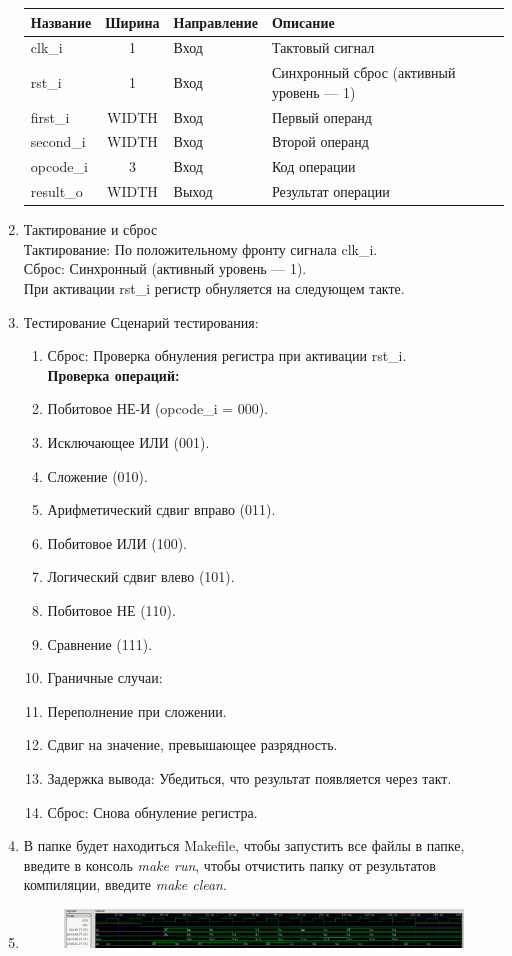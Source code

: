 \documentclass[a4paper,12pt]{article} %
\begin{document}
\begin{enumerate}
\begin{table}[H]
\begin{tabular}{|l|c|l|p{6cm}|}
\textbf{Название} & \textbf{Ширина} & \textbf{Направление} & \textbf{Описание} \\ \hline
clk\_i    & 1      & Вход    & Тактовый сигнал \\ \hline
rst\_i    & 1      & Вход    & Синхронный сброс (активный уровень — 1) \\ \hline
first\_i  & WIDTH  & Вход    & Первый операнд \\ \hline
second\_i & WIDTH  & Вход    & Второй операнд \\ \hline
opcode\_i & 3      & Вход    & Код операции \\ \hline
result\_o & WIDTH  & Выход   & Результат операции \\ \hline
\end{tabular}
\end{table}
\item
Тактирование и сброс\\
Тактирование: По положительному фронту сигнала clk\_i.\\
Сброс: Синхронный (активный уровень — 1).\\
При активации rst\_i регистр обнуляется на следующем такте.
\item 
Тестирование
Сценарий тестирования:
\begin{enumerate}
\item Сброс: Проверка обнуления регистра при активации rst\_i.\\
\textbf{Проверка операций:}
\item Побитовое НЕ-И (opcode\_i = 000).
\item Исключающее ИЛИ (001).
\item Сложение (010).
\item Арифметический сдвиг вправо (011).
\item Побитовое ИЛИ (100).
\item Логический сдвиг влево (101).
\item Побитовое НЕ (110).
\item Сравнение (111).
\item Граничные случаи:
\item Переполнение при сложении.
\item Сдвиг на значение, превышающее разрядность.
\item Задержка вывода: Убедиться, что результат появляется через такт.
\item Сброс: Снова обнуление регистра.
\end{enumerate}
\item В папке будет находиться Makefile, чтобы запустить все файлы в папке, введите в консоль \textit{make run}, чтобы отчистить папку от результатов компиляции, введите \textit{make clean}.
\item
\begin{figure}[H]
    \centering
    \includegraphics[width=1\linewidth]{Formal/tb.png}
\end{figure}
\end{enumerate}
\end{document}
